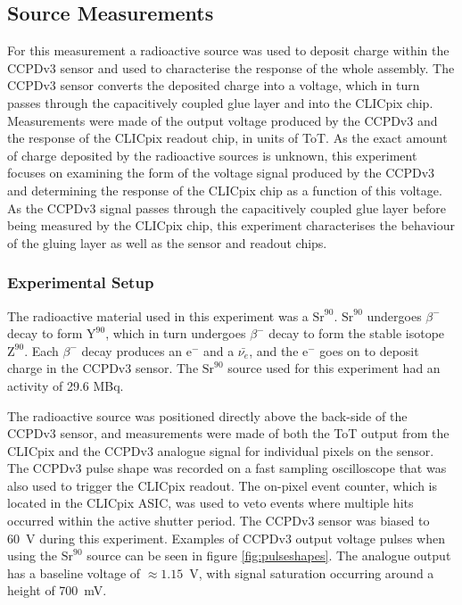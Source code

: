 \subsection{Source Measurements}
\label{sec:source}
For this measurement a radioactive source was used to deposit charge within the CCPDv3 sensor and used to characterise the response of the whole assembly.  The CCPDv3 sensor converts the deposited charge into a voltage, which in turn passes through the capacitively coupled glue layer and into the CLICpix chip.  Measurements were made of the output voltage produced by the CCPDv3 and the response of the CLICpix readout chip, in units of ToT.  As the exact amount of charge deposited by the radioactive sources is unknown, this experiment focuses on examining the form of the voltage signal produced by the CCPDv3 and determining the response of the CLICpix chip as a function of this voltage.  As the CCPDv3 signal passes through the capacitively coupled glue layer before being measured by the CLICpix chip, this experiment characterises the behaviour of the gluing layer as well as the sensor and readout chips.


\subsubsection{Experimental Setup}
The radioactive material used in this experiment was a $\text{Sr}^{90}$.  $\text{Sr}^{90}$ undergoes $\beta^{-}$ decay to form $\text{Y}^{90}$, which in turn undergoes $\beta^{-}$ decay to form the stable isotope $\text{Z}^{90}$.  Each $\beta^{-}$ decay produces an $\text{e}^{-}$ and a $\bar{\nu_{e}}$, and the $\text{e}^{-}$ goes on to deposit charge in the CCPDv3 sensor.  The $\text{Sr}^{90}$ source used for this experiment had an activity of 29.6 MBq.  

The radioactive source was positioned directly above the back-side of the CCPDv3 sensor, and measurements were made of both the ToT output from the CLICpix and the CCPDv3 analogue signal for individual pixels on the sensor.  The CCPDv3 pulse shape was recorded on a fast sampling oscilloscope that was also used to trigger the CLICpix readout.  The on-pixel event counter, which is located in the CLICpix ASIC, was used to veto events where multiple hits occurred within the active shutter period.  The CCPDv3 sensor was biased to 60~V during this experiment.  Examples of CCPDv3 output voltage pulses when using the $\text{Sr}^{90}$ source can be seen in figure \ref{fig:pulseshapes}.  The analogue output has a baseline voltage of $\approx 1.15$~V, with signal saturation occurring around a height of 700~mV.  

